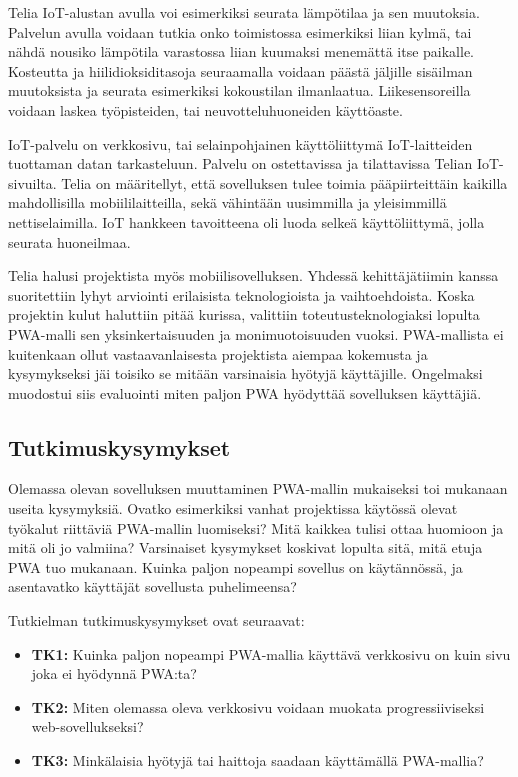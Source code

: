 \documentclass{tktltiki}
\begin{document}
Telia IoT-alustan avulla voi esimerkiksi seurata lämpötilaa ja sen muutoksia. Palvelun avulla voidaan tutkia onko toimistossa esimerkiksi liian kylmä, tai nähdä nousiko lämpötila varastossa liian kuumaksi menemättä itse paikalle. Kosteutta ja hiilidioksiditasoja seuraamalla voidaan päästä jäljille sisäilman muutoksista ja seurata esimerkiksi kokoustilan ilmanlaatua. Liikesensoreilla voidaan laskea työpisteiden, tai neuvotteluhuoneiden käyttöaste. 

IoT-palvelu on verkkosivu, tai selainpohjainen käyttöliittymä IoT-laitteiden tuottaman datan tarkasteluun. Palvelu on ostettavissa ja tilattavissa Telian IoT-sivuilta. Telia on määritellyt, että sovelluksen tulee toimia pääpiirteittäin kaikilla mahdollisilla mobiililaitteilla, sekä vähintään uusimmilla ja yleisimmillä nettiselaimilla. IoT hankkeen tavoitteena oli luoda selkeä käyttöliittymä, jolla seurata huoneilmaa. 

Telia halusi projektista myös mobiilisovelluksen. Yhdessä kehittäjätiimin kanssa suoritettiin lyhyt arviointi erilaisista teknologioista ja vaihtoehdoista. Koska projektin kulut haluttiin pitää kurissa, valittiin toteutusteknologiaksi lopulta PWA-malli sen yksinkertaisuuden ja monimuotoisuuden vuoksi. PWA-mallista ei kuitenkaan ollut vastaavanlaisesta projektista aiempaa kokemusta ja kysymykseksi jäi toisiko se mitään varsinaisia hyötyjä käyttäjille. Ongelmaksi muodostui siis evaluointi miten paljon PWA hyödyttää sovelluksen käyttäjiä.

\subsection{Tutkimuskysymykset}

Olemassa olevan sovelluksen muuttaminen PWA-mallin mukaiseksi toi mukanaan useita kysymyksiä. Ovatko esimerkiksi vanhat projektissa käytössä olevat työkalut riittäviä PWA-mallin luomiseksi? Mitä kaikkea tulisi ottaa huomioon ja mitä oli jo valmiina? Varsinaiset kysymykset koskivat lopulta sitä, mitä etuja PWA tuo mukanaan. Kuinka paljon nopeampi sovellus on käytännössä, ja asentavatko käyttäjät sovellusta puhelimeensa?

Tutkielman tutkimuskysymykset ovat seuraavat:

\begin{itemize}
  \item \textbf{TK1:} Kuinka paljon nopeampi PWA-mallia käyttävä verkkosivu on kuin sivu joka ei hyödynnä PWA:ta?
  \item \textbf{TK2:} Miten olemassa oleva verkkosivu voidaan muokata progressiiviseksi web-sovellukseksi?
  \item \textbf{TK3:} Minkälaisia hyötyjä tai haittoja saadaan käyttämällä PWA-mallia? 
\end{itemize}
\end{document}
